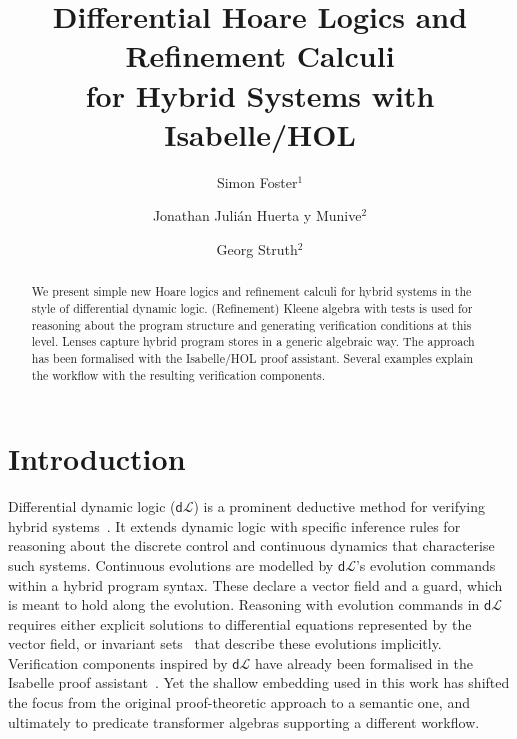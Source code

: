 \documentclass[envcountsame,envcountsect]{llncs}
\newcommand{\dL}{\mathsf{d}\mathcal{L}}
\begin{document}
\title{Differential Hoare Logics and Refinement Calculi\\ for Hybrid Systems with Isabelle/HOL}


\author{Simon Foster$^1$ \and Jonathan Juli\'an Huerta y Munive$^2$ \and Georg Struth$^2$} 


\maketitle

\begin{abstract} 
  We present simple new Hoare logics and refinement calculi for hybrid
  systems in the style of differential dynamic logic. (Refinement)
  Kleene algebra with tests is used for reasoning about the program
  structure and generating verification conditions at this level.
  Lenses capture hybrid program stores in a generic algebraic way. The
  approach has been formalised with the Isabelle/HOL proof
  assistant. Several examples explain the workflow with the
  resulting verification components.
\end{abstract}



\section{Introduction}\label{sec:introduction}

Differential dynamic logic ($\dL$) is a prominent deductive method for
verifying hybrid systems~\cite{Platzer18}. It extends dynamic logic
with specific inference rules for reasoning about the discrete
control and continuous dynamics that characterise such
systems. Continuous evolutions are modelled by $\dL$'s evolution
commands within a hybrid program syntax. These declare a vector field
and a guard, which is meant to hold along the evolution.  Reasoning
with evolution commands in $\dL$ requires either explicit solutions to
differential equations represented by the vector field, or invariant
sets~\cite{Teschl12} that describe these evolutions implicitly. Verification
components inspired by $\dL$ have already been formalised in the
Isabelle proof assistant~\cite{MuniveS19}. Yet the shallow embedding
used in this work has shifted the focus from the original proof-theoretic approach
to a semantic one, and ultimately to predicate transformer algebras
supporting a  different workflow.
\end{document}
